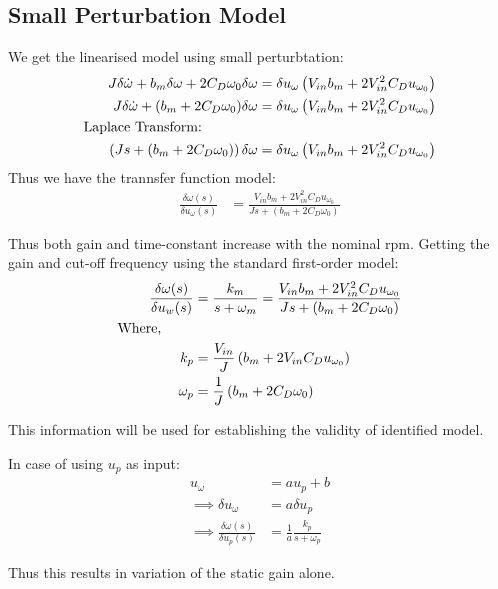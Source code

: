 \subsection{Small Perturbation Model}
We get the linearised model using small perturbtation:
\begin{align*}
    J \delta \dot \omega + b_m \delta \omega + 2 C_D \omega_0 \delta \omega  &= \delta u_\omega \left( V_{in} b_m + 2V_{in}^2 C_D u_{\omega_0} \right)\\
    J \delta \dot \omega + (b_m + 2 C_D \omega_0) \delta \omega  &= \delta u_\omega \left( V_{in} b_m + 2V_{in}^2 C_D u_{\omega_0} \right)\\
    \text{Laplace Transform:} \qquad \qquad &\\
     \left( Js + (b_m + 2 C_D \omega_0) \right) \delta \omega  &= \delta u_\omega \left( V_{in} b_m + 2V_{in}^2 C_D u_{\omega_0} \right)
\end{align*}
Thus we have the trannsfer function model:
\begin{align*}
    \frac{\delta \omega(s)}{\delta u_\omega (s)} &= \frac{V_{in} b_m + 2V_{in}^2 C_D u_{\omega_0}}{Js + (b_m + 2 C_D \omega_0)}
\end{align*}

Thus both gain and time-constant increase with the nominal rpm. Getting the gain and cut-off frequency using the standard first-order model:
\begin{align*}
    \frac{\delta \omega(s)}{\delta u_w(s)} &= \frac{k_m}{s + \omega_m} = \frac{V_{in} b_m + 2V_{in}^2C_D u_{\omega_0}}{Js + (b_m + 2 C_D \omega_0)}\\
    \text{Where, } \qquad &\\
    k_p &= \frac{V_{in}}{J} \left(  b_m + 2V_{in}C_D u_{\omega_0} \right)\\
    \omega_p &= \frac{1}{J}\left( b_m + 2 C_D \omega_0 \right)
\end{align*}

This information will be used for establishing the validity of identified model.

In case of using $u_p$ as input:
\begin{align*}
    u_\omega &= a u_p + b\\
    \implies \delta u_\omega &= a \delta u_p\\
    \implies \frac{\delta \omega(s)}{\delta u_p(s)} &= \frac{1}{a}\frac{k_p}{s + \omega_p}
\end{align*}

Thus this results in variation of the static gain alone.
